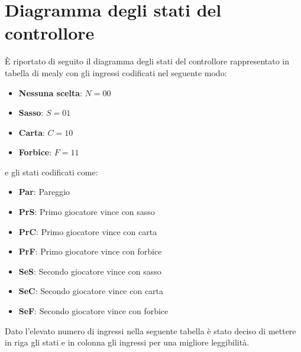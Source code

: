 \documentclass[a4paper]{article}
\begin{document}
\section{Diagramma degli stati del controllore}
È riportato di seguito il diagramma degli stati del controllore rappresentato in tabella di mealy
con gli ingressi codificati nel seguente modo:
\begin{itemize}
	\item \textbf{Nessuna scelta}: $N = 00$
	\item \textbf{Sasso}: $S = 01$
	\item \textbf{Carta}: $C = 10$
	\item \textbf{Forbice}: $F = 11$
\end{itemize}
e gli stati codificati come:
\begin{itemize}
	\item \textbf{Par}: Pareggio
	\item \textbf{PrS}: Primo giocatore vince con sasso
	\item \textbf{PrC}: Primo giocatore vince con carta
	\item \textbf{PrF}: Primo giocatore vince con forbice
	\item \textbf{SeS}: Secondo giocatore vince con sasso
	\item \textbf{SeC}: Secondo giocatore vince con carta
	\item \textbf{SeF}: Secondo giocatore vince con forbice
\end{itemize}
Dato l'elevato numero di ingressi nella seguente tabella è stato deciso di mettere in riga gli stati e in
colonna gli ingressi per una migliore leggibilità.
\end{document}

